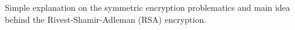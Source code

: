 ﻿Simple explanation on the symmetric encryption problematics
and main idea behind the Rivest-Shamir-Adleman (RSA) encryption.
